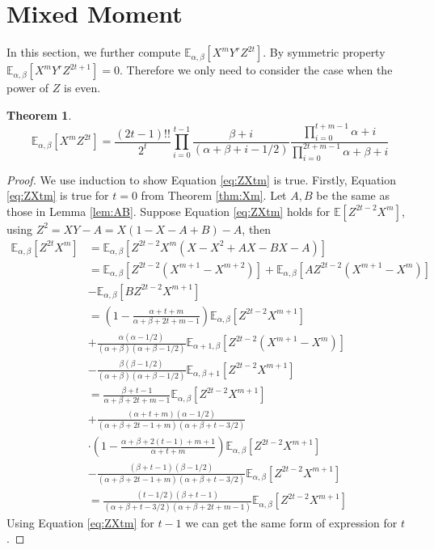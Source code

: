 \documentclass[review,authoryear]{elsarticle}
\def\E{\mathbb{E}}
\newtheorem{theorem}{Theorem}
\begin{document}
\section{Mixed Moment}
In this section, we further compute $\E_{\alpha,\beta}[X^mY^rZ^{2t}]$.
By symmetric property  $\E_{\alpha,\beta}[X^mY^rZ^{2t+1}] = 0$.
Therefore we only need to consider the case when the power of $Z$
is even.
\begin{theorem}\label{thm:mm}
	\begin{equation}\label{eq:ZXtm}
	\E_{\alpha, \beta}[X^mZ^{2t}] = \frac{(2t-1)!!}{2^t}
	\prod_{i=0}^{t-1}
	\frac{\beta+i}{(\alpha+\beta+i-1/2)}
	\frac{\prod_{i=0}^{t+m-1}\alpha+i}{\prod_{i=0}^{2t+m-1}
		\alpha+\beta+i}
	\end{equation}
\end{theorem}
\begin{proof}
	We use induction to show Equation \eqref{eq:ZXtm} is true.
	Firstly, Equation \eqref{eq:ZXtm} is true for $t=0$ from 
	Theorem \ref{thm:Xm}. Let $A, B$ be the same as those
	in Lemma \ref{lem:AB}.
	Suppose Equation \eqref{eq:ZXtm} holds for $\E[Z^{2t-2}X^m]$,
	using $Z^2=XY-A=X(1-X-A+B)-A$, then
	\begin{align*}
	\E_{\alpha,\beta}[Z^{2t}X^m] &=
	\E_{\alpha,\beta}[Z^{2t-2}X^m(X-X^2+AX-BX-A)] \\
	&= \E_{\alpha,\beta}[Z^{2t-2}(X^{m+1} - X^{m+2})] +
	\E_{\alpha,\beta}[A Z^{2t-2} (X^{m+1} - X^m)] \\
	&-
	\E_{\alpha,\beta}[BZ^{2t-2} X^{m+1}] \\
	&= \left(1-\frac{\alpha+t+m}{\alpha+\beta+2t+m-1}
	\right)\E_{\alpha, \beta}[Z^{2t-2}X^{m+1}] \\
	&+
	\frac{\alpha(\alpha-1/2)}{(\alpha+\beta)(\alpha+\beta-1/2)}
	\E_{\alpha+1,\beta}[Z^{2t-2}(X^{m+1} - X^m)] \\
	&-\frac{\beta(\beta-1/2)}{(\alpha+\beta)(\alpha+\beta-1/2)}
	\E_{\alpha,\beta+1}[Z^{2t-2}X^{m+1}]\\
	&=\frac{\beta+t-1}{\alpha+\beta + 2t+m-1}
	\E_{\alpha,\beta}[Z^{2t-2}X^{m+1}] \\
	&+\frac{(\alpha+t+m)(\alpha-1/2)}{(\alpha+\beta+2t-1+m)(\alpha+\beta + t - 3/2)}\\
	&\cdot
	\left(1-\frac{\alpha+\beta+2(t-1)+m+1}{\alpha+t+m}\right)
	\E_{\alpha, \beta}[Z^{2t-2}X^{m+1}] \\
	&-\frac{(\beta+t-1)(\beta-1/2)}{(\alpha+\beta+2t-1+m)(\alpha+\beta + t - 3/2)}
	\E_{\alpha,\beta}[Z^{2t-2}X^{m+1}]\\
	&=\frac{(t-1/2)(\beta+t-1)}{(\alpha+\beta+t-3/2)(\alpha+\beta+2t+m-1)}
	\E_{\alpha, \beta}[Z^{2t-2}X^{m+1}]
	\end{align*}
	Using Equation \eqref{eq:ZXtm} for $t-1$
	we can get the same form of expression for $t$.
\end{proof}
\end{document}
